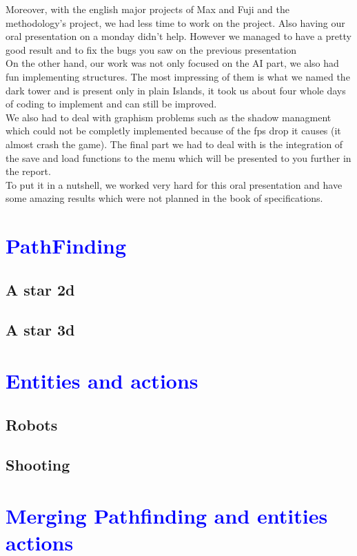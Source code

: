 \documentclass[article]{report}             %
\begin{document}
 			Moreover, with the english major projects of Max and Fuji and the methodology's project, we had less time to work on the project. Also having our oral presentation on a monday didn't help. However we managed to have a pretty good result and to fix the bugs you saw on the previous presentation\\

 			On the other hand, our work was not only focused on the AI part, we also had fun implementing structures. The most impressing of them is what we named the dark tower and is present only in plain Islands, it took us about four whole days of coding to implement and can still be improved.\\
			
			We also had to deal with graphism problems such as the shadow managment which could not be completly implemented because of the fps drop it causes (it almost crash the game). The final part we had to deal with is the integration of the save and load functions to the menu which will be presented to you further in the report.\\
			
			To put it in a nutshell, we worked very hard for this oral presentation and have some amazing results which were not planned in the book of specifications. 
  		\chapter{\textcolor{blue}{PathFinding}}
			\section{A star 2d}
			\section{A star 3d}
				
		\chapter{\textcolor{blue}{Entities and actions}}
			\section{Robots}
			\section{Shooting}
		\chapter{\textcolor{blue}{Merging Pathfinding and entities actions}}
			
\end{document}
